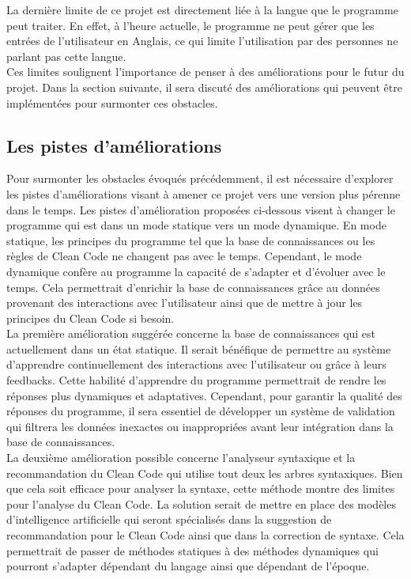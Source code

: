 \documentclass{rapport}
\begin{document}
La dernière limite de ce projet est directement liée à la langue que le programme peut traiter. En effet, à l'heure actuelle, le programme ne peut gérer que les entrées de l'utilisateur en Anglais, ce qui limite l'utilisation par des personnes ne parlant pas cette langue.\\

Ces limites soulignent l'importance de penser à des améliorations pour le futur du projet. Dans la section suivante, il sera discuté des améliorations qui peuvent être implémentées pour surmonter ces obstacles.

\newpage
\subsection{Les pistes d'améliorations}
Pour surmonter les obstacles évoqués précédemment, il est nécessaire d'explorer les pistes d'améliorations visant à amener ce projet vers une version plus pérenne dans le temps. Les pistes d'amélioration proposées ci-dessous visent à changer le programme qui est dans un mode statique vers un mode dynamique. En mode statique, les principes du programme tel que la base de connaissances ou les règles de Clean Code ne changent pas avec le temps. Cependant, le mode dynamique confère au programme la capacité de s'adapter et d'évoluer avec le temps. Cela permettrait d'enrichir la base de connaissances grâce au données provenant des interactions avec l'utilisateur ainsi que de mettre à jour les principes du Clean Code si besoin.\\

La première amélioration suggérée concerne la base de connaissances qui est actuellement dans un état statique. Il serait bénéfique de permettre au système d'apprendre continuellement des interactions avec l'utilisateur ou grâce à leurs feedbacks. Cette habilité d'apprendre du programme permettrait de rendre les réponses plus dynamiques et adaptatives. Cependant, pour garantir la qualité des réponses du programme, il sera essentiel de développer un système de validation qui filtrera les données inexactes ou inappropriées avant leur intégration dans la base de connaissances.\\

La deuxième amélioration possible concerne l'analyseur syntaxique et la recommandation du Clean Code qui utilise tout deux les arbres syntaxiques. Bien que cela soit efficace pour analyser la syntaxe, cette méthode montre des limites pour l'analyse du Clean Code. La solution serait de mettre en place des modèles d'intelligence artificielle qui seront spécialisés dans la suggestion de recommandation pour le Clean Code ainsi que dans la correction de syntaxe. Cela permettrait de passer de méthodes statiques à des méthodes dynamiques qui pourront s'adapter dépendant du langage ainsi que dépendant de l'époque.\\
\end{document}
